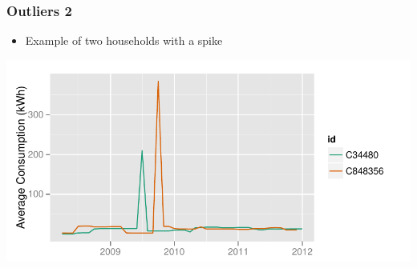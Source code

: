 \documentclass{beamer}
\begin{document}
\begin{frame}
\frametitle{Outliers 2}
\begin{itemize}
\item Example of two households with a spike
\end{itemize}
\begin{center}
\includegraphics[width=1\textwidth]{figures/outlier2}
\end{center}
\end{frame}
\end{document}

